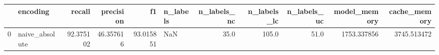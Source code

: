 \begin{tabular}{llrrrlrrrrr}
\toprule
{} &        encoding &     recall &  precision &         f1 & n\_labels &  n\_labels\_nc &  n\_labels\_lc &  n\_labels\_uc &  model\_memory &  cache\_memory \\
\midrule
0 &  naive\_absolute &  92.375102 &  46.357616 &  93.015851 &      NaN &         35.0 &        105.0 &         51.0 &   1753.337856 &   3745.513472 \\
\bottomrule
\end{tabular}
